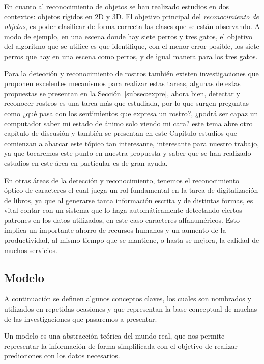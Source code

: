 En cuanto al reconocimiento de objetos se han realizado estudios en dos contextos: objetos rígidos en 2D y 3D\@. El objetivo principal del \textit{reconocimiento de objetos}, es poder clasificar de forma correcta las clases que se están observando. A modo de ejemplo, en una escena donde hay siete perros y tres gatos, el objetivo del algoritmo que se utilice es que identifique, con el menor error posible, los siete perros que hay en una escena como perros, y de igual manera para los tres gatos.

Para la detección y reconocimiento de rostros también existen investigaciones que proponen excelentes mecanismos para realizar estas tareas, algunas de estas propuestas se presentan en la Sección~\ref{subsec:expre}, ahora bien, detectar y reconocer rostros es una tarea más que estudiada, por lo que surgen preguntas como ¿qué pasa con los sentimientos que expresa un rostro?, ¿podrá ser capaz un computador saber mi estado de ánimo solo viendo mi cara? este tema abre otro capítulo de discusión y también se presentan en este Capítulo estudios que comienzan a abarcar este tópico tan interesante, interesante para nuestro trabajo, ya que tocaremos este punto en nuestra propuesta y saber que se han realizado estudios en este área en particular es de gran ayuda.

En otras áreas de la detección y reconocimiento, tenemos el reconocimiento óptico de caracteres el cual juega un rol fundamental en la tarea de digitalización de libros, ya que al generarse tanta información escrita y de distintas formas, es vital contar con un sistema que lo haga automáticamente detectando ciertos patrones en los datos utilizados, en este caso caracteres alfanuméricos. Esto implica un importante ahorro de recursos humanos y un aumento de la productividad, al mismo tiempo que se mantiene, o hasta se mejora, la calidad de muchos servicios.

\subsection{Modelo}
\label{subsec:modelo}
A continuación se definen algunos conceptos claves, los cuales son nombrados y utilizados en repetidas ocasiones y que representan la base conceptual de muchas de las investigaciones que pasaremos a presentar.
\begin{definition}[Modelo]
Un modelo es una abstracción teórica del mundo real, que nos permite representar la información de forma simplificada con el objetivo de realizar predicciones con los datos necesarios.
\end{definition}

